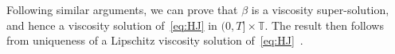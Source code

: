 \documentclass[JEP,XML,SOM,Unicode,published]{cedram}
\theoremstyle{plain}
\theoremstyle{remark}
\newcommand\T{\mathbb{T}}
\begin{document}
Following similar arguments, we can prove that $\beta$ is a viscosity super-solution, and hence a viscosity solution of~\eqref{eq:HJ} in $(0,T]\times \T$. The result then follows from uniqueness of a Lipschitz viscosity solution of~\eqref{eq:HJ}~\cite{GB:94}.




\end{document}
